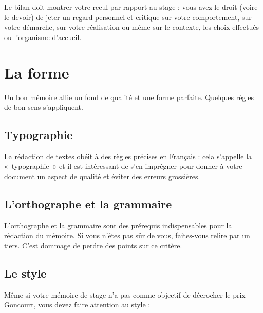 \documentclass [twoside,openright,a4paper,11pt,french] {report}
\begin{document}
Le bilan doit montrer votre recul par rapport au stage : vous avez le
droit (voire le devoir) de jeter un regard personnel et critique sur
votre comportement, sur votre démarche, sur votre réalisation ou même
sur le contexte, les choix effectués ou l'organisme d'accueil.



\chapter {La forme}
    \label {chap:contexte}

Un bon mémoire allie un fond de qualité et une forme parfaite. Quelques
règles de bon sens s'appliquent.

\section {Typographie}

La rédaction de textes obéit à des règles précises en
Français : cela s'appelle la «~typographie~» \cite{andre1990} et il
est intéressant de s'en imprégner pour donner à votre document un
aspect de qualité et éviter des erreurs grossières.

\section {L'orthographe et la grammaire}

L'orthographe et la grammaire sont des prérequis indispensables pour
la rédaction du mémoire. Si vous n'êtes pas sûr de vous, faites-vous
relire par un tiers. C'est dommage de perdre des points sur ce critère.

\section {Le style}

Même si votre mémoire de stage n'a pas comme objectif de décrocher
le prix Goncourt, vous devez faire attention au style :
\end{document}
